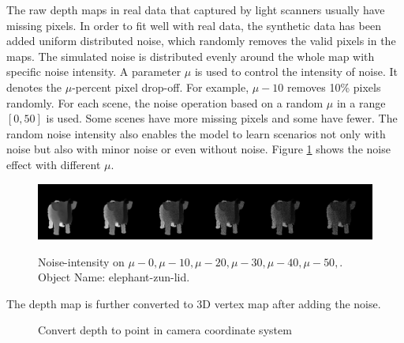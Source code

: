 The raw depth maps in real data that captured by light scanners usually have missing pixels. In order to fit well with real data, the synthetic data has been added uniform distributed noise, which randomly removes the valid pixels in the maps.
The simulated noise is distributed evenly around the whole map with specific noise intensity. A parameter $ \mu $ is used to control the intensity of noise. It denotes the $ \mu $-percent pixel drop-off. For example, $ \mu-10 $ removes 10\% pixels randomly. For each scene, the noise operation based on a random $ \mu $ in a range $ \left[0, 50\right]  $ is used. Some scenes have more missing pixels and some have fewer. The random noise intensity also enables the model to learn scenarios not only with noise but also with minor noise or even without noise.
Figure \ref{fig:noise-intensity} shows the noise effect with different $ \mu $.
\begin{figure}[!h]
	\centering
	{\includegraphics[width=.9\textwidth]{./Figures/add_noise_depth.png}}
	\decoRule
	\caption{Noise-intensity on $ \mu-0, \mu-10,\mu-20, \mu-30, \mu-40, \mu-50,$. Object Name: elephant-zun-lid.}
	\label{fig:noise-intensity}
\end{figure}


The depth map is further converted to 3D vertex map after adding the noise.
\begin{figure}[h!]
	\centering
	\decoRule
	\caption{Convert depth to point in camera coordinate system}
	\label{fig:depth-triangulation}
\end{figure}

